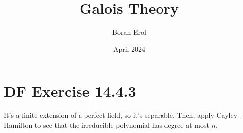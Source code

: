 \documentclass{article}
\title{Galois Theory}
\date{April 2024}
\author{Boran Erol}
\theoremstyle{definition}
\begin{document}
\maketitle

\section{DF Exercise 14.4.3}

It's a finite extension of a perfect field, so it's separable.
Then, apply Cayley-Hamilton to see that the irreducible polynomial has
degree at most $n$.

\newpage
\end{document}
